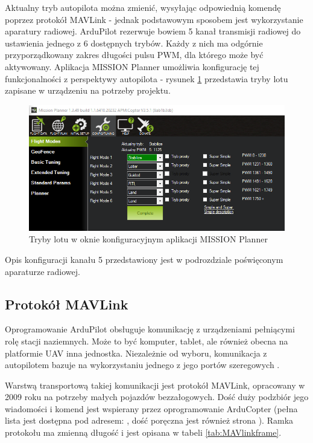 Aktualny tryb autopilota można zmienić, wysyłając odpowiednią komendę poprzez protokół MAVLink - jednak podstawowym sposobem jest wykorzystanie aparatury radiowej. ArduPilot rezerwuje bowiem 5 kanał transmisji radiowej do ustawienia jednego z 6 dostępnych trybów. Każdy z nich ma odgórnie przyporządkowany zakres długości pulsu PWM, dla którego może być aktywowany. Aplikacja MISSION Planner umożliwia konfigurację tej funkcjonalności z perspektywy autopilota - rysunek \ref{fig:flight_modes} przedstawia tryby lotu zapisane w urządzeniu na potrzeby projektu.

\begin{figure}[ht]
	\centering
	\includegraphics[width=14cm]{B_flight_modes.png}
	\caption{Tryby lotu w oknie konfiguracyjnym aplikacji MISSION Planner}
	\label{fig:flight_modes}
\end{figure}

Opis konfiguracji kanału 5 przedstawiony jest w podrozdziale poświęconym aparaturze radiowej.
\subsection{Protokół MAVLink}
\label{subsec:MAVLink}
Oprogramowanie ArduPilot obsługuje komunikację z urządzeniami pełniącymi rolę stacji naziemnych. Może to być komputer, tablet, ale również obecna na platformie UAV inna jednostka. Niezależnie od wyboru, komunikacja z autopilotem bazuje na wykorzystaniu jednego z jego portów szeregowych \cite{PixhawkSerial}.

Warstwą transportową takiej komunikacji jest protokół MAVLink, opracowany w 2009 roku na potrzeby małych pojazdów bezzałogowych. 
Dość duży podzbiór jego wiadomości i komend jest wspierany przez oprogramowanie ArduCopter (pełna lista jest dostępna pod adresem: \cite{ArduCopterCmds}, dość poręczna jest również strona \cite{MAVLinkMSG}). 
Ramka protokołu ma zmienną długość i jest opisana w tabeli \ref{tab:MAVlinkframe}.

